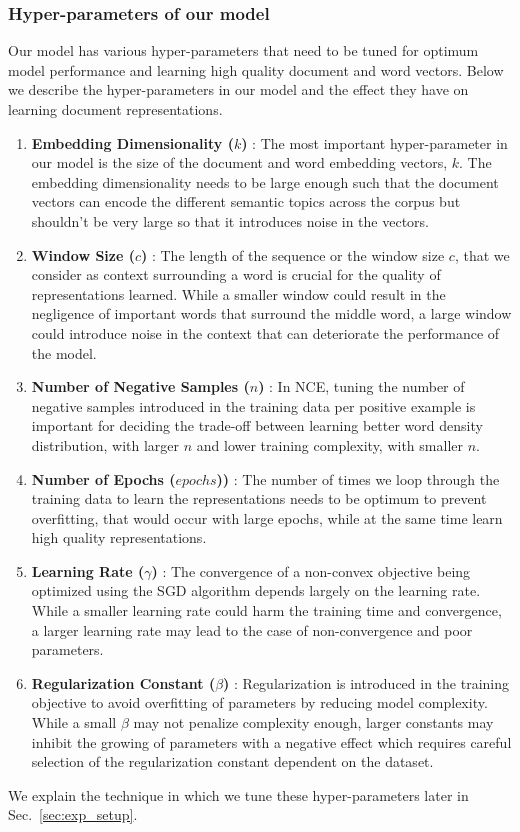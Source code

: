 \subsubsection{Hyper-parameters of our model}
\label{sec:hp_doc}
Our model has various hyper-parameters that need to be tuned for optimum model performance and learning high quality document and word vectors. Below we describe the hyper-parameters in our model and the effect they have on learning document representations.
\begin{enumerate}
\item \textbf{Embedding Dimensionality ($k$)} : The most important hyper-parameter in our model is the size of the document and word embedding vectors, $k$. The embedding dimensionality needs to be large enough such that the document vectors can encode the different semantic topics across the corpus but shouldn't be very large so that it introduces noise in the vectors.

\item \textbf{Window  Size ($c$)} : The length of the sequence or the window size $c$, that we consider as context surrounding a word is crucial for the quality of representations learned. While a smaller window could result in the negligence of important words that surround the middle word, a large window could introduce noise in the context that can deteriorate the performance of the model.

\item \textbf{Number of Negative Samples ($n$)} : In NCE, tuning the number of negative samples introduced in the training data per positive example is important for deciding the trade-off between learning better word density distribution, with larger $n$ and lower training complexity, with smaller $n$. 

\item \textbf{Number of Epochs ($epochs$))} : The number of times we loop through the training data to learn the representations needs to be optimum to prevent overfitting, that would occur with large epochs, while at the same time learn high quality representations.

\item \textbf{Learning Rate ($\gamma$)} : The convergence of a non-convex objective being optimized using the SGD algorithm depends largely on the learning rate. 
While a smaller learning rate could harm the training time and convergence, a larger learning rate may lead to the case of non-convergence and poor parameters.

\item \textbf{Regularization Constant ($\beta$)} : Regularization is introduced in the training objective to avoid overfitting of parameters by reducing model complexity. While a small $\beta$ may not penalize complexity enough, larger constants may inhibit the growing of parameters with a negative effect which requires careful selection of the regularization constant dependent on the dataset.
\end{enumerate}
We explain the technique in which we tune these hyper-parameters later in Sec.~\ref{sec:exp_setup}.




